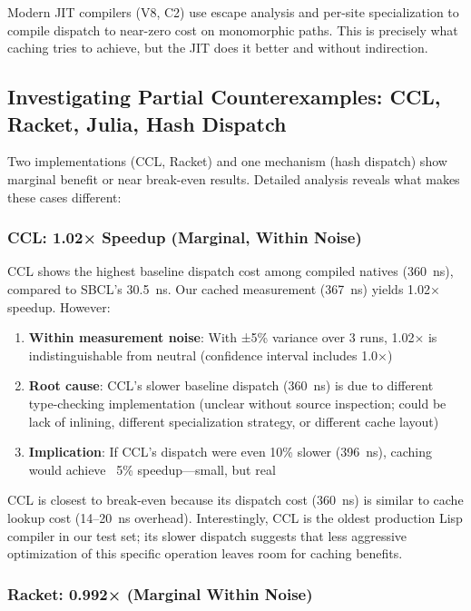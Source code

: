 \documentclass[sigplan,final,acmsmall,review,screen]{acmart}
\begin{document}
Modern JIT compilers (V8, C2) use escape analysis and per-site specialization to compile dispatch
to near-zero cost on monomorphic paths. This is precisely what caching tries to achieve, but the
JIT does it better and without indirection.

\subsection{Investigating Partial Counterexamples: CCL, Racket, Julia, Hash Dispatch}
\label{sec:counterexamples}

Two implementations (CCL, Racket) and one mechanism (hash dispatch) show marginal benefit or near break-even results.
Detailed analysis reveals what makes these cases different:

\subsubsection{CCL: 1.02× Speedup (Marginal, Within Noise)}

CCL shows the highest baseline dispatch cost among compiled natives (360~ns), compared to SBCL's 30.5~ns. Our cached measurement (367~ns)
yields 1.02× speedup. However:

\begin{enumerate}
  \item \textbf{Within measurement noise}: With ±5\% variance over 3 runs, 1.02× is indistinguishable from neutral (confidence interval includes 1.0×)
  \item \textbf{Root cause}: CCL's slower baseline dispatch (360~ns) is due to different type-checking implementation (unclear without source inspection;
    could be lack of inlining, different specialization strategy, or different cache layout)
  \item \textbf{Implication}: If CCL's dispatch were even 10\% slower (396~ns), caching would achieve ~5\% speedup—small, but real
\end{enumerate}

CCL is closest to break-even because its dispatch cost (360~ns) is similar to cache lookup cost (14--20~ns overhead).
Interestingly, CCL is the oldest production Lisp compiler in our test set; its slower dispatch suggests that less aggressive
optimization of this specific operation leaves room for caching benefits.

\subsubsection{Racket: 0.992× (Marginal Within Noise)}
\end{document}
